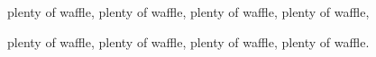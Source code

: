 \begin{acknowledgements}

plenty of waffle, plenty of waffle, plenty of waffle, plenty of waffle,

plenty of waffle, plenty of waffle, plenty of waffle, plenty of waffle.

\end{acknowledgements}